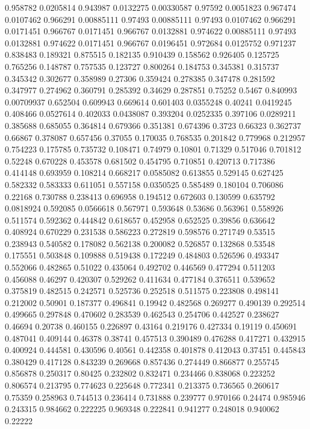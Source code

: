0.958782 0.0205814
0.943987 0.0132275
0.00330587 0.97592
0.0051823 0.967474
0.0107462 0.966291
0.00885111 0.97493
0.00885111 0.97493
0.0107462 0.966291
0.0171451 0.966767
0.0171451 0.966767
0.0132881 0.974622
0.00885111 0.97493
0.0132881 0.974622
0.0171451 0.966767
0.0196451 0.972684
0.0125752 0.971237
0.838483 0.189321
0.875515 0.182135
0.910439 0.158562
0.926405 0.125725
0.765256 0.148787
0.757535 0.123727
0.800264 0.184753
0.345381 0.315737
0.345342 0.302677
0.358989 0.27306
0.359424 0.278385
0.347478 0.281592
0.347977 0.274962
0.360791 0.285392
0.34629 0.287851
0.75252 0.5467
0.840993 0.00709937
0.652504 0.609943
0.669614 0.601403
0.0355248 0.40241
0.0419245 0.408466
0.0527614 0.402033
0.0438087 0.393204
0.0252335 0.397106
0.0289211 0.385688
0.685055 0.364814
0.679366 0.351381
0.674396 0.3723
0.66323 0.362737
0.66867 0.378087
0.657456 0.37055
0.170035 0.768535
0.201842 0.779968
0.212957 0.754223
0.175785 0.735732
0.108471 0.74979
0.10801 0.71329
0.517046 0.701812
0.52248 0.670228
0.453578 0.681502
0.454795 0.710851
0.420713 0.717386
0.414148 0.693959
0.108214 0.668217
0.0585082 0.613855
0.529145 0.627425
0.582332 0.583333
0.611051 0.557158
0.0350525 0.585489
0.180104 0.706086
0.22168 0.730788
0.238413 0.696958
0.194512 0.672603
0.130599 0.635792
0.0818924 0.592085
0.0566618 0.567971
0.593648 0.53686
0.563961 0.558926
0.511574 0.592362
0.444842 0.618657
0.452958 0.652525
0.39856 0.636642
0.408924 0.670229
0.231538 0.586223
0.272819 0.598576
0.271749 0.53515
0.238943 0.540582
0.178082 0.562138
0.200082 0.526857
0.132868 0.53548
0.175551 0.503848
0.109888 0.519438
0.172249 0.484803
0.526596 0.493347
0.552066 0.482865
0.51022 0.435064
0.492702 0.446569
0.477294 0.511203
0.456088 0.46297
0.420307 0.529262
0.411634 0.477184
0.376511 0.539652
0.375819 0.482515
0.242571 0.525736
0.252518 0.511575
0.223808 0.498141
0.212002 0.50901
0.187377 0.496841
0.19942 0.482568
0.269277 0.490139
0.292514 0.499665
0.297848 0.470602
0.283539 0.462543
0.254706 0.442527
0.238627 0.46694
0.20738 0.460155
0.226897 0.43164
0.219176 0.427334
0.19119 0.450691
0.487041 0.409144
0.46378 0.38741
0.457513 0.390489
0.476288 0.417271
0.432915 0.400924
0.444581 0.430596
0.40561 0.442358
0.401878 0.412043
0.37451 0.445843
0.380429 0.417128
0.843239 0.269668
0.857436 0.274449
0.866877 0.255745
0.856878 0.250317
0.80425 0.232802
0.832471 0.234466
0.838068 0.223252
0.806574 0.213795
0.774623 0.225648
0.772341 0.213375
0.736565 0.260617
0.75359 0.258963
0.744513 0.236414
0.731888 0.239777
0.970166 0.24474
0.985946 0.243315
0.984662 0.222225
0.969348 0.222841
0.941277 0.248018
0.940062 0.22222
